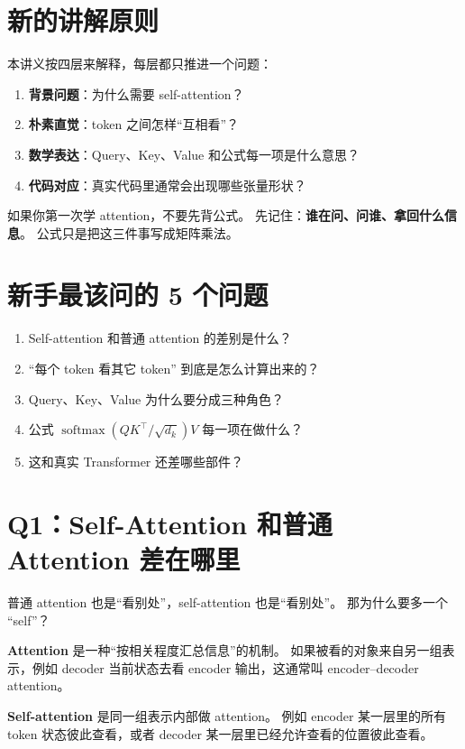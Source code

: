 \documentclass[11pt,a4paper]{ctexart}
\newcommand{\softmax}{\operatorname{softmax}}
\begin{document}
\section{新的讲解原则}

本讲义按四层来解释，每层都只推进一个问题：

\begin{enumerate}[label=\textbf{\arabic*.}]
  \item \textbf{背景问题}：为什么需要 self-attention？
  \item \textbf{朴素直觉}：token 之间怎样“互相看”？
  \item \textbf{数学表达}：Query、Key、Value 和公式每一项是什么意思？
  \item \textbf{代码对应}：真实代码里通常会出现哪些张量形状？
\end{enumerate}

\begin{keypointblock}
如果你第一次学 attention，不要先背公式。
先记住：\textbf{谁在问、问谁、拿回什么信息}。
公式只是把这三件事写成矩阵乘法。
\end{keypointblock}

\section{新手最该问的 5 个问题}

\begin{enumerate}[label=\textbf{Q\arabic*.}]
  \item Self-attention 和普通 attention 的差别是什么？
  \item “每个 token 看其它 token” 到底是怎么计算出来的？
  \item Query、Key、Value 为什么要分成三种角色？
  \item 公式 \(\softmax(QK^\top/\sqrt{d_k})V\) 每一项在做什么？
  \item 这和真实 Transformer 还差哪些部件？
\end{enumerate}

\section{Q1：Self-Attention 和普通 Attention 差在哪里}

\begin{questionblock}
普通 attention 也是“看别处”，self-attention 也是“看别处”。
那为什么要多一个 “self”？
\end{questionblock}

\begin{definitionblock}
\textbf{Attention} 是一种“按相关程度汇总信息”的机制。
如果被看的对象来自另一组表示，例如 decoder 当前状态去看 encoder 输出，这通常叫 encoder--decoder attention。

\textbf{Self-attention} 是同一组表示内部做 attention。
例如 encoder 某一层里的所有 token 状态彼此查看，或者 decoder 某一层里已经允许查看的位置彼此查看。
\end{definitionblock}
\end{document}
